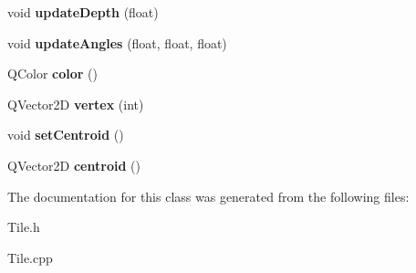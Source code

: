 \begin{DoxyCompactItemize}
\item 
\hypertarget{class_tile_ad2c01b4cbacf5ffb1555e32e1cf47989}{}void {\bfseries update\+Depth} (float)\label{class_tile_ad2c01b4cbacf5ffb1555e32e1cf47989}

\item 
\hypertarget{class_tile_a462fbfd2e194bb58e11b585fde37e7e4}{}void {\bfseries update\+Angles} (float, float, float)\label{class_tile_a462fbfd2e194bb58e11b585fde37e7e4}

\item 
\hypertarget{class_tile_ac0d98055b1404168bc0a7fc492300faf}{}Q\+Color {\bfseries color} ()\label{class_tile_ac0d98055b1404168bc0a7fc492300faf}

\item 
\hypertarget{class_tile_a410e2f7ec7fb802f1422a93b8a241af8}{}Q\+Vector2\+D {\bfseries vertex} (int)\label{class_tile_a410e2f7ec7fb802f1422a93b8a241af8}

\item 
\hypertarget{class_tile_a7d5cc53c9a43f117dcedc8f61e78c9af}{}void {\bfseries set\+Centroid} ()\label{class_tile_a7d5cc53c9a43f117dcedc8f61e78c9af}

\item 
\hypertarget{class_tile_a30bde1dc7cfb999f919762312ec02706}{}Q\+Vector2\+D {\bfseries centroid} ()\label{class_tile_a30bde1dc7cfb999f919762312ec02706}

\end{DoxyCompactItemize}


The documentation for this class was generated from the following files\+:\begin{DoxyCompactItemize}
\item 
Tile.\+h\item 
Tile.\+cpp\end{DoxyCompactItemize}
